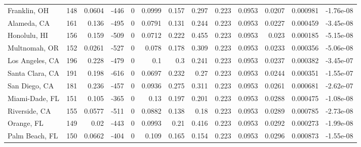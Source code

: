 \documentclass[12pt,letterpaper]{article}
\begin{document}
\begin{sidewaystable}
{\begin{tabular}{lrrrrrrrrrrrr}
 Franklin, OH       & 148   & 0.0604  & -446   &     0 &          0.0999 &           0.157  &         0.297  &              0.223 &             0.0953 &           0.0207  &        0.000981 &       -1.76e-08  \\
 Alameda, CA        & 161   & 0.136   & -495   &     0 &          0.0791 &           0.131  &         0.244  &              0.223 &             0.0953 &           0.0227  &        0.000459 &       -3.45e-08  \\
 Honolulu, HI       & 156   & 0.159   & -509   &     0 &          0.0712 &           0.222  &         0.455  &              0.223 &             0.0953 &           0.023   &        0.000185 &       -5.15e-08  \\
 Multnomah, OR      & 152   & 0.0261  & -527   &     0 &          0.078  &           0.178  &         0.309  &              0.223 &             0.0953 &           0.0233  &        0.000356 &       -5.06e-08  \\
 Los Angeles, CA    & 196   & 0.228   & -479   &     0 &          0.1    &           0.3    &         0.241  &              0.223 &             0.0953 &           0.0237  &        0.000382 &       -3.45e-07  \\
 Santa Clara, CA    & 191   & 0.198   & -616   &     0 &          0.0697 &           0.232  &         0.27   &              0.223 &             0.0953 &           0.0244  &        0.000351 &       -1.55e-07  \\
 San Diego, CA      & 181   & 0.236   & -457   &     0 &          0.0936 &           0.275  &         0.311  &              0.223 &             0.0953 &           0.0261  &        0.000681 &       -2.62e-07  \\
 Miami-Dade, FL     & 151   & 0.105   & -365   &     0 &          0.13   &           0.197  &         0.201  &              0.223 &             0.0953 &           0.0288  &        0.000475 &       -1.08e-08  \\
 Riverside, CA      & 155   & 0.0577  & -511   &     0 &          0.0882 &           0.138  &         0.18   &              0.223 &             0.0953 &           0.0289  &        0.000785 &       -2.73e-08  \\
 Orange, FL         & 149   & 0.02    & -443   &     0 &          0.0993 &           0.21   &         0.416  &              0.223 &             0.0953 &           0.0292  &        0.000273 &       -1.99e-08  \\
 Palm Beach, FL     & 150   & 0.0662  & -404   &     0 &          0.109  &           0.165  &         0.154  &              0.223 &             0.0953 &           0.0296  &        0.000873 &       -1.55e-08  \\

\end{tabular}}
\end{sidewaystable}
\end{document}
